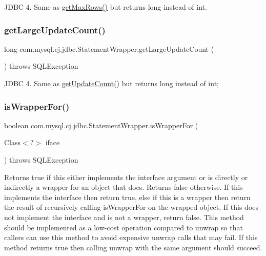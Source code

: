 J\+D\+BC 4. Same as \mbox{\hyperlink{}{get\+Max\+Rows()}} but returns long instead of int. \mbox{\label{classcom_1_1mysql_1_1cj_1_1jdbc_1_1_statement_wrapper_a2d0e35e66a5244ef9218c70d17296a2a}} 
\subsubsection{\texorpdfstring{get\+Large\+Update\+Count()}{getLargeUpdateCount()}}
{\footnotesize\ttfamily long com.\+mysql.\+cj.\+jdbc.\+Statement\+Wrapper.\+get\+Large\+Update\+Count (\begin{DoxyParamCaption}{ }\end{DoxyParamCaption}) throws S\+Q\+L\+Exception}

J\+D\+BC 4. Same as \mbox{\hyperlink{}{get\+Update\+Count()}} but returns long instead of int; \mbox{\label{classcom_1_1mysql_1_1cj_1_1jdbc_1_1_statement_wrapper_ac909b23a76074610336931e26f634d2d}} 
\subsubsection{\texorpdfstring{is\+Wrapper\+For()}{isWrapperFor()}}
{\footnotesize\ttfamily boolean com.\+mysql.\+cj.\+jdbc.\+Statement\+Wrapper.\+is\+Wrapper\+For (\begin{DoxyParamCaption}\item[{Class$<$?$>$}]{iface }\end{DoxyParamCaption}) throws S\+Q\+L\+Exception}

Returns true if this either implements the interface argument or is directly or indirectly a wrapper for an object that does. Returns false otherwise. If this implements the interface then return true, else if this is a wrapper then return the result of recursively calling {\ttfamily is\+Wrapper\+For} on the wrapped object. If this does not implement the interface and is not a wrapper, return false. This method should be implemented as a low-\/cost operation compared to {\ttfamily unwrap} so that callers can use this method to avoid expensive {\ttfamily unwrap} calls that may fail. If this method returns true then calling {\ttfamily unwrap} with the same argument should succeed.


